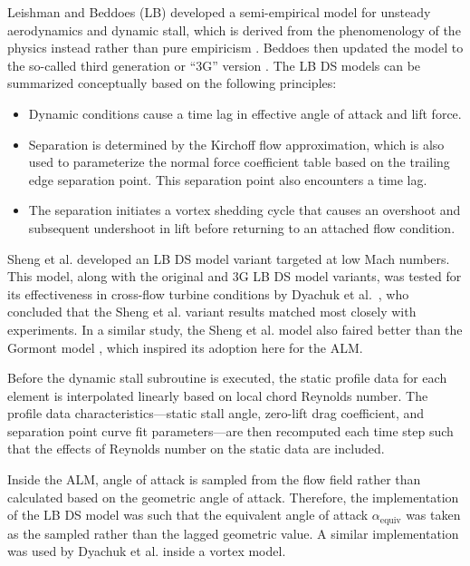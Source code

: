 Leishman and Beddoes (LB) developed a semi-empirical model for unsteady
aerodynamics and dynamic stall, which is derived from the phenomenology of the
physics instead rather than pure empiricism \cite{Leishman1989}. Beddoes then
updated the model to the so-called third generation or ``3G'' version
\cite{Beddoes1993}. The LB DS models can be summarized conceptually based on the
following principles:
\begin{itemize}
    \item Dynamic conditions cause a time lag in effective angle of attack and
    lift force.
    
    \item Separation is determined by the Kirchoff flow approximation, which is
    also used to parameterize the normal force coefficient table based on the
    trailing edge separation point. This separation point also encounters a time
    lag.
    
    \item The separation initiates a vortex shedding cycle that causes an
    overshoot and subsequent undershoot in lift before returning to an attached
    flow condition.
\end{itemize}

Sheng et al. \cite{Sheng2008} developed an LB DS model variant targeted at low
Mach numbers. This model, along with the original and 3G LB DS model variants,
was tested for its effectiveness in cross-flow turbine conditions by Dyachuk et
al.~\cite{Dyachuk2014}, who concluded that the Sheng et al. variant results
matched most closely with experiments. In a similar study, the Sheng et al.
model also faired better than the Gormont model \cite{Dyachuk2015}, which
inspired its adoption here for the ALM.

Before the dynamic stall subroutine is executed, the static profile data for
each element is interpolated linearly based on local chord Reynolds number. The
profile data characteristics---static stall angle, zero-lift drag coefficient,
and separation point curve fit parameters---are then recomputed each time step
such that the effects of Reynolds number on the static data are included.

Inside the ALM, angle of attack is sampled from the flow field rather than
calculated based on the geometric angle of attack. Therefore, the implementation
of the LB DS model was such that the equivalent angle of attack
$\alpha_\mathrm{equiv}$ was taken as the sampled rather than the lagged
geometric value. A similar implementation was used by Dyachuk et al.
\cite{Dyachuk2015a} inside a vortex model.


